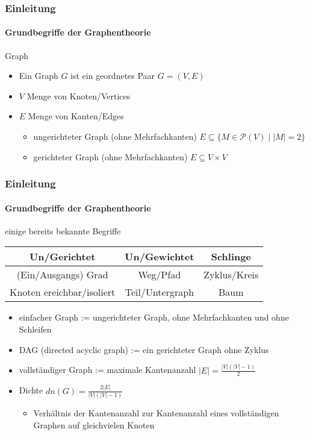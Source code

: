 \begin{frame}
    \frametitle{Einleitung}
    \framesubtitle{Grundbegriffe der Graphentheorie}
    \begin{KITexampleblock}{Graph}
\begin{itemize}
    \item Ein Graph $G$ ist ein geordnetes Paar $G = (V, E)$
    \item $V$ Menge von Knoten/Vertices
    \item $E$ Menge von Kanten/Edges
    \begin{itemize}
        \item ungerichteter Graph (ohne Mehrfachkanten) $E \subseteq \{ M \in \mathcal{P}(V) \mid |M| = 2\}$
        \item gerichteter Graph (ohne Mehrfachkanten) $E \subseteq V \times V$
    \end{itemize}
\end{itemize}
    \end{KITexampleblock}
\end{frame}
\begin{frame}
    \frametitle{Einleitung}
    \framesubtitle{Grundbegriffe der Graphentheorie}
    \begin{center}
    einige bereits bekannte Begriffe \\
    \begin{tabular}{c | c | c}
    \hline
    Un/Gerichtet & Un/Gewichtet & Schlinge \\ \hline
    (Ein/Ausgangs) Grad & Weg/Pfad & Zyklus/Kreis \\ \hline
    Knoten ereichbar/isoliert & Teil/Untergraph & Baum \\ \hline
    \end{tabular}
    \end{center}
    \begin{itemize}
    \item einfacher Graph := ungerichteter Graph, ohne Mehrfachkanten und ohne Schleifen
    \item DAG (directed acyclic graph) := ein gerichteter Graph ohne Zyklus
    \item vollständiger Graph := maximale Kantenanzahl \( |E| = \frac{|V| (|V| - 1)}{2}\)
    \item Dichte \( dn(G) = \frac{2|E|}{|V| (|V| - 1)}\)
    \begin{itemize}
        \item Verhältnis der Kantenanzahl zur Kantenanzahl eines vollständigen Graphen auf gleichvielen Knoten
    \end{itemize}
    \end{itemize}
\end{frame}

